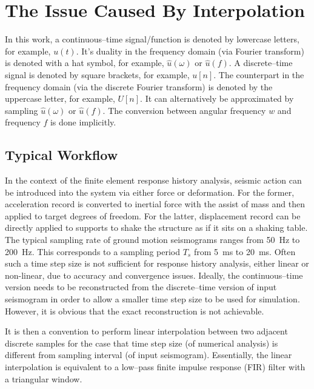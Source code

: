 \section{The Issue Caused By Interpolation}
In this work, a continuous--time signal/function is denoted by lowercase letters, for example, $u\left(t\right)$. It's duality in the frequency domain (via Fourier transform) is denoted with a hat symbol, for example, $\hat{u}\left(\omega\right)$ or $\hat{u}\left(f\right)$. A discrete--time signal is denoted by square brackets, for example, $u[n]$. The counterpart in the frequency domain (via the discrete Fourier transform) is denoted by the uppercase letter, for example, $U[n]$. It can alternatively be approximated by sampling $\hat{u}\left(\omega\right)$ or $\hat{u}\left(f\right)$. The conversion between angular frequency $w$ and frequency $f$ is done implicitly.
\subsection{Typical Workflow}
In the context of the finite element response history analysis, seismic action can be introduced into the system via either force or deformation. For the former, acceleration record is converted to inertial force with the assist of mass and then applied to target degrees of freedom. For the latter, displacement record can be directly applied to supports to shake the structure as if it sits on a shaking table.
The typical sampling rate of ground motion seismograms ranges from \SI{50}{\hertz} to \SI{200}{\hertz}. This corresponds to a sampling period $T_s$ from \SI{5}{\milli\second} to \SI{20}{\milli\second}. Often such a time step size is not sufficient for response history analysis, either linear or non-linear, due to accuracy and convergence issues. Ideally, the continuous--time version needs to be reconstructed from the discrete--time version of input seismogram in order to allow a smaller time step size to be used for simulation. However, it is obvious that the exact reconstruction is not achievable.

It is then a convention to perform linear interpolation between two adjacent discrete samples for the case that time step size (of numerical analysis) is different from sampling interval (of input seismogram). Essentially, the linear interpolation is equivalent to a low--pass finite impulse response (FIR) filter with a triangular window.

